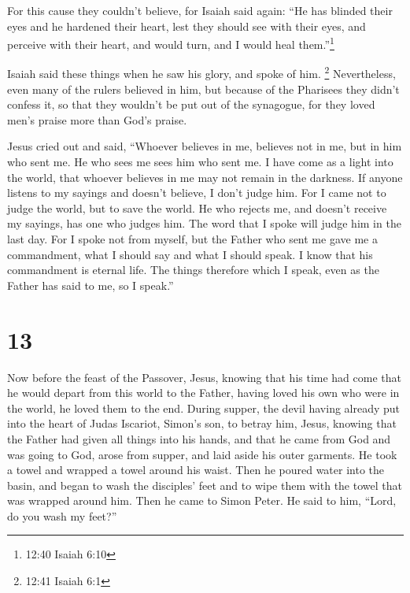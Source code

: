  For this cause they couldn't believe, for Isaiah said
again:  ``He has blinded their eyes and he hardened their
heart, lest they should see with their eyes, and perceive with their
heart, and would turn, and I would heal them.''\footnote{12:40 Isaiah
  6:10}

 Isaiah said these things when he saw his glory, and spoke
of him. \footnote{12:41 Isaiah 6:1}  Nevertheless, even
many of the rulers believed in him, but because of the Pharisees they
didn't confess it, so that they wouldn't be put out of the synagogue,
 for they loved men's praise more than God's praise.

 Jesus cried out and said, ``Whoever believes in me,
believes not in me, but in him who sent me.  He who sees me
sees him who sent me.  I have come as a light into the
world, that whoever believes in me may not remain in the darkness.
 If anyone listens to my sayings and doesn't believe, I
don't judge him. For I came not to judge the world, but to save the
world.  He who rejects me, and doesn't receive my sayings,
has one who judges him. The word that I spoke will judge him in the last
day.  For I spoke not from myself, but the Father who sent
me gave me a commandment, what I should say and what I should speak.
 I know that his commandment is eternal life. The things
therefore which I speak, even as the Father has said to me, so I
speak.''

\hypertarget{section-12}{%
\section{13}\label{section-12}}

 Now before the feast of the Passover, Jesus, knowing that
his time had come that he would depart from this world to the Father,
having loved his own who were in the world, he loved them to the end.
 During supper, the devil having already put into the heart
of Judas Iscariot, Simon's son, to betray him,  Jesus,
knowing that the Father had given all things into his hands, and that he
came from God and was going to God,  arose from supper, and
laid aside his outer garments. He took a towel and wrapped a towel
around his waist.  Then he poured water into the basin, and
began to wash the disciples' feet and to wipe them with the towel that
was wrapped around him.  Then he came to Simon Peter. He
said to him, ``Lord, do you wash my feet?''

